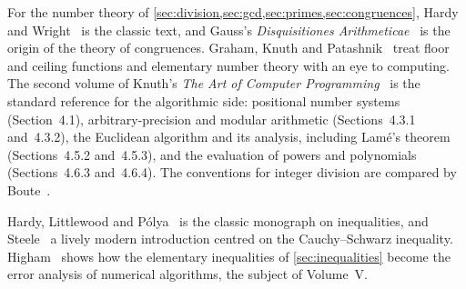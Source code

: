 For the number theory of \cref{sec:division,sec:gcd,sec:primes,sec:congruences}, Hardy and Wright~\cite{hardywright2008} is the classic text, and Gauss's \emph{Disquisitiones Arithmeticae}~\cite{gauss1801} is the origin of the theory of congruences. Graham, Knuth and Patashnik~\cite{graham1994concrete} treat floor and ceiling functions and elementary number theory with an eye to computing. The second volume of Knuth's \emph{The Art of Computer Programming}~\cite{knuth1997taocp2} is the standard reference for the algorithmic side: positional number systems (Section~4.1), arbitrary-precision and modular arithmetic (Sections~4.3.1 and~4.3.2), the Euclidean algorithm and its analysis, including Lam\'e's theorem~\cite{lame1844} (Sections~4.5.2 and~4.5.3), and the evaluation of powers and polynomials (Sections~4.6.3 and~4.6.4). The conventions for integer division are compared by Boute~\cite{boute1992}.

Hardy, Littlewood and P\'olya~\cite{hardy1952inequalities} is the classic monograph on inequalities, and Steele~\cite{steele2004} a lively modern introduction centred on the Cauchy--Schwarz inequality. Higham~\cite{higham2002accuracy} shows how the elementary inequalities of \cref{sec:inequalities} become the error analysis of numerical algorithms, the subject of Volume~V.

\chapterreferences
